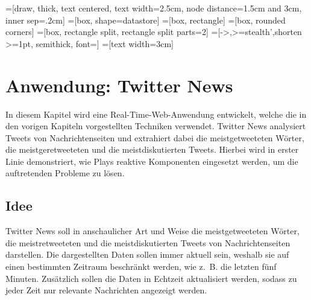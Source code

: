 
\makeatletter
{}
\makeatother

=[draw, thick, text centered, text width=2.5cm, node distance=1.5cm and 3cm, inner sep=.2cm]
=[box, shape=datastore]
=[box, rectangle]
=[box, rounded corners]
=[box, rectangle split, rectangle split parts=2]
=[->,>=stealth',shorten >=1pt, semithick, font=\footnotesize]
=[text width=3cm]

\chapter{Anwendung: Twitter News} %
\label{cha:anwendung}

In diesem Kapitel wird eine Real-Time-Web-Anwendung entwickelt, welche die in den vorigen Kapiteln vorgestellten Techniken verwendet.
Twitter News analysiert Tweets von Nachrichtenseiten und extrahiert dabei die meistgetweeteten Wörter, die meistgeretweeteten und die meistdiskutierten Tweets.
Hierbei wird in erster Linie demonstriert, wie Plays reaktive Komponenten eingesetzt werden, um die auftretenden Probleme zu lösen.

\section{Idee} %
\label{sec:idee}

Twitter News soll in anschaulicher Art und Weise die meistgetweeteten Wörter, die meistretweeteten und die meistdiskutierten Tweets von Nachrichtenseiten darstellen.
Die dargestellten Daten sollen immer aktuell sein, weshalb sie auf einen bestimmten Zeitraum beschränkt werden, wie z.~B. die letzten fünf Minuten.
Zusätzlich sollen die Daten in Echtzeit aktualisiert werden, sodass zu jeder Zeit nur relevante Nachrichten angezeigt werden.

